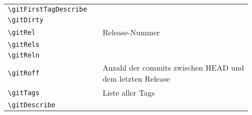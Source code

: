 \begin{table}[b]
\begin{tabularx}{\textwidth}{lFF}
		\verb_\gitFirstTagDescribe_ &
			\gitFirstTagDescribe &
			\\
		\verb_\gitDirty_ &
			\gitDirty &
			\\
		\verb_\gitRel_ &
			\gitRel &
			Release-Nummer \\
		\verb_\gitRels_ &
			\gitRels &
			\\
		\verb_\gitReln_ &
			\gitReln &
			\\
		\verb_\gitRoff_ &
			\gitRoff &
			Anzahl der commits zwischen HEAD und dem letzten Release \\
		\verb_\gitTags_ &
			\gitTags &
			Liste aller Tags \\
		\verb_\gitDescribe_ &
			\gitDescribe &
			\\ \hline
	\end{tabularx}
\end{table}
\FloatBarrier



